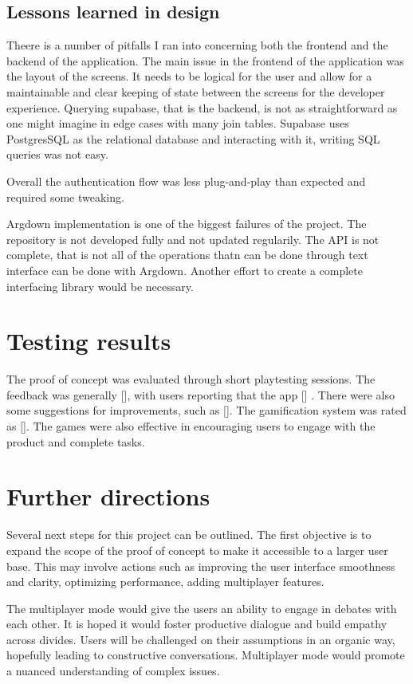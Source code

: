 \documentclass{article}
\begin{document}
\subsection{Lessons learned in design}
Theere is a number of pitfalls I ran into concerning both the frontend and the backend of the application. The main issue in the frontend of the application was the layout of the screens. It needs to be logical for the user and allow for a maintainable and clear keeping of state between the screens for the developer experience. Querying supabase, that is the backend, is not as straightforward as one might imagine in edge cases with many join tables. Supabase uses PostgresSQL as the relational database and interacting with it, writing SQL queries was not easy. 

Overall the authentication flow was less plug-and-play than expected and required some tweaking. 

Argdown implementation is one of the biggest failures of the project. The repository is not developed fully and not updated regularily. The API is not complete, that is not all of the operations thatn can be done through text interface can be done with Argdown. Another effort to create a complete interfacing library would be necessary.

\section{Testing results}
The proof of concept was evaluated through short playtesting sessions. The feedback was generally [], with users reporting that the app [] . There were also some suggestions for improvements, such as [].
The gamification system was rated as [].
The games were also effective in encouraging users to engage with the product and complete tasks.


\section{Further directions}
Several next steps for this project can be outlined. The first objective is to expand the scope of the proof of concept to make it accessible to a larger user base. This may involve actions such as improving the user interface smoothness and clarity, optimizing performance, adding multiplayer features.

The multiplayer mode would give the users an ability to engage in debates with each other. It is hoped it would foster productive dialogue and build empathy across divides.
Users will be challenged on their assumptions in an organic way, hopefully leading to constructive conversations. Multiplayer mode would promote a nuanced understanding of complex issues.
\end{document}
